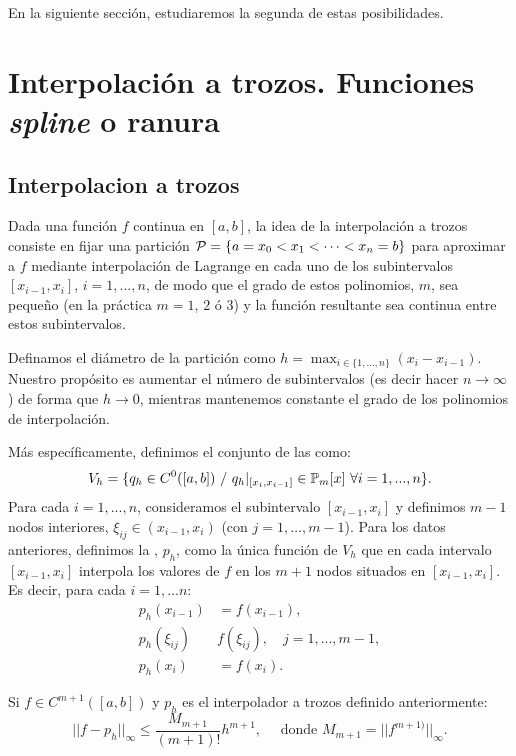 En la siguiente sección, estudiaremos la segunda de estas
posibilidades.

\section{Interpolación a trozos. Funciones \textit{spline} o ranura}
\label{sec:interp-trozos-splines}

\subsection{Interpolacion a trozos}
\label{sec:interpolacion-trozos}


Dada una función $f$ continua en $[a,b]$, la idea de la interpolación
a trozos consiste en fijar una partición ${\cal
  P}=\{a=x_0<x_1<\cdots<x_n=b\}$ para aproximar a $f$ mediante
interpolación de Lagrange en cada uno de los subintervalos
$[x_{i-1},x_{i}]$, $i=1,...,n$, de modo que el grado de estos
polinomios, $m$, sea pequeño (en la práctica $m=1$, $2$ ó $3$) y la
función resultante sea continua entre estos subintervalos.

Definamos el diámetro de la partición como
$h=\max_{i\in\{1,...,n\}}(x_i-x_{i-1})$. Nuestro propósito es aumentar
el número de subintervalos (es decir hacer $n\to \infty$) de forma
que $h\to 0$, mientras mantenemos constante el grado de los polinomios
de interpolación.

Más específicamente, definimos el conjunto de las  como:
\begin{equation*}
  V_h = \{ q_h\in C^0([a,b]) \ /\ q_h|_{[x_i,x_{i-1}]}\in \Pol_m[x]\
  \forall i=1,...,n \}.
\end{equation*}
Para cada $i=1,...,n$, consideramos el subintervalo $[x_{i-1},x_i]$ y
definimos $m-1$ nodos interiores, $\xi_{ij}\in (x_{i-1},x_i)$ (con
$j=1,\dots,m-1$). Para los datos anteriores, definimos la
, $p_h$, como
la única función de $V_h$ que en cada intervalo $[x_{i-1},x_i]$
interpola los valores de $f$ en los $m+1$ nodos situados en $[x_{i-1},
x_{i}]$.  Es decir, para cada $i=1,\dots n$:
\begin{align*}
p_h(x_{i-1})&=f(x_{i-1}),\\
p_h(\xi_{ij})&f(\xi_{ij}), \quad j=1,...,m-1,\\
p_h(x_i)&=f(x_i).
\end{align*}

\begin{theorem}
  \label{thm:interpol-trozos-error}
  Si $f\in C^{m+1}( [a,b])$ y $p_h$ es el interpolador a trozos
  definido anteriormente:
  \begin{equation}
    ||f-p_h||_\infty\le\frac{M_{m+1}}{(m+1)!}h^{m+1},
    \quad
    \text{ donde } M_{m+1}=||f^{m+1)}||_\infty.
    \label{eq:interpol-trozos-error}
  \end{equation}
\end{theorem}

